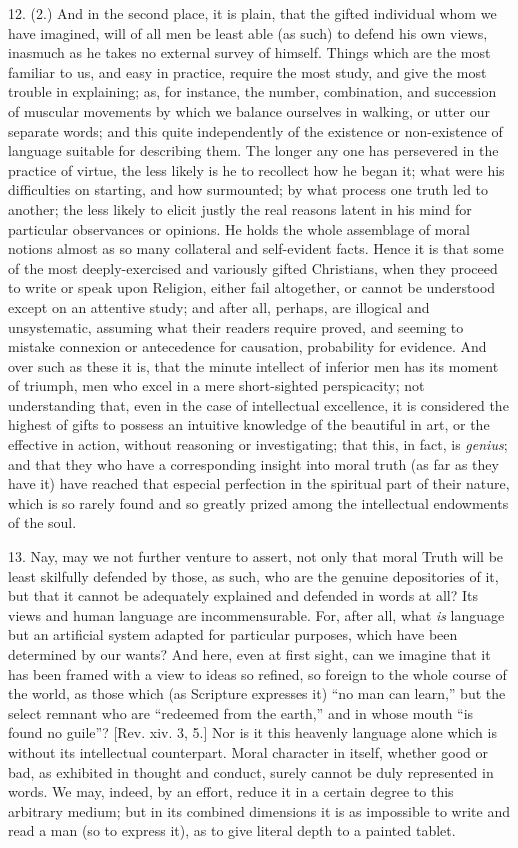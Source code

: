 12. (2.) And in the second place, it is plain, that the gifted
individual whom we have imagined, will of all men be least able (as
such) to defend his own views, inasmuch as he takes no external survey
of himself. Things which are the most familiar to us, and easy in
practice, require the most study, and give the most trouble in
explaining; as, for instance, the number, combination, and succession
of muscular movements by which we balance ourselves in walking, or
utter our separate words; and this quite independently of the
existence or non-existence of language suitable for describing them.
The longer any one has persevered in the practice of virtue, the less
likely is he to recollect how he began it; what were his difficulties
on starting, and how surmounted; by what process one truth led to
another; the less likely to elicit justly the real reasons latent in
his mind for particular observances or opinions. He holds the whole
assemblage of moral notions almost as so many collateral and
self-evident facts. Hence it is that some of the most deeply-exercised
and variously gifted Christians, when they proceed to write or speak
upon Religion, either fail altogether, or cannot be understood except
on an attentive study; and after all, perhaps, are illogical and
unsystematic, assuming what their readers require proved, and seeming
to mistake connexion or antecedence for causation, probability for
evidence. And over such as these it is, that the minute intellect of
inferior men has its moment of triumph, men who excel in a mere
short-sighted perspicacity; not understanding that, even in the case
of intellectual excellence, it is considered the highest of gifts to
possess an intuitive knowledge of the beautiful in art, or the
effective in action, without reasoning or investigating; that this, in
fact, is \emph{genius}; and that they who have a corresponding insight
into moral truth (as far as they have it) have reached that especial
perfection in the spiritual part of their nature, which is so rarely
found and so greatly prized among the intellectual endowments of the
soul.

13. Nay, may we not further venture to assert, not only that moral
Truth will be least skilfully defended by those, as such, who are the
genuine depositories of it, but that it cannot be adequately explained
and defended in words at all? Its views and human language are
incommensurable. For, after all, what \emph{is} language but an
artificial system adapted for particular purposes, which have been
determined by our wants? And here, even at first sight, can we imagine
that it has been framed with a view to ideas so refined, so foreign to
the whole course of the world, as those which (as Scripture expresses
it) ``no man can learn,'' but the select remnant who are
``redeemed from the earth,'' and in whose mouth ``is found
no guile''? [Rev. xiv. 3, 5.] Nor is it this heavenly language
alone which is without its intellectual counterpart. Moral character
in itself, whether good or bad, as exhibited in thought and conduct,
surely cannot be duly represented in words. We may, indeed, by an
effort, reduce it in a certain degree to this arbitrary medium; but in
its combined dimensions it is as impossible to write and read a man
(so to express it), as to give literal depth to a painted tablet.

